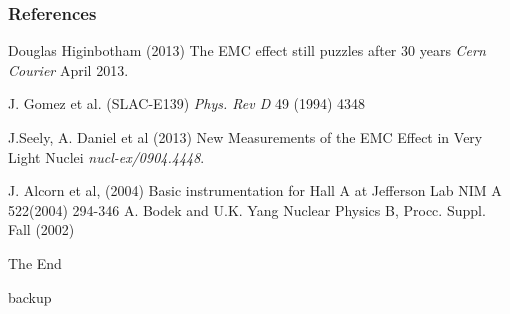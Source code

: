 \documentclass{beamer}
\begin{document}
\begin{frame}
\frametitle{References}
\footnotesize{
\begin{thebibliography}{99} %
 Douglas Higinbotham (2013) 
\newblock The EMC effect still puzzles after 30 years
\newblock \emph{Cern Courier} April 2013.

 J. Gomez et al. (SLAC-E139)  
\newblock \emph{Phys. Rev D}  49 (1994) 4348 

 J.Seely, A. Daniel et al (2013) 
\newblock New Measurements of the EMC Effect in Very Light Nuclei
\newblock \emph{nucl-ex/0904.4448}.

 J. Alcorn et al, (2004)
\newblock Basic instrumentation for Hall A at Jefferson Lab
\newblock NIM A 522(2004) 294-346
 A. Bodek and U.K. Yang
\newblock Nuclear Physics B, Procc. Suppl. Fall (2002) 

\end{thebibliography}
}
\end{frame}

\begin{frame}
\Huge{\centerline{The End}}
\end{frame}



\begin{frame}{backup}

\end{frame}
\begin{frame}

\end{frame}
\end{document}

